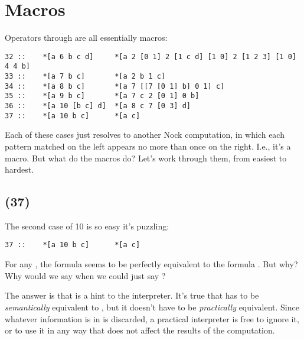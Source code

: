 \section{Macros}

Operators  through  are all essentially macros:

\begin{framed_shaded}
\begin{Verbatim}[fontsize=\relsize{-2.5},fontseries=b,commandchars=\\\{\}]
32 ::    *[a 6 b c d]     *[a 2 [0 1] 2 [1 c d] [1 0] 2 [1 2 3] [1 0] 4 4 b]
33 ::    *[a 7 b c]       *[a 2 b 1 c]
34 ::    *[a 8 b c]       *[a 7 [[7 [0 1] b] 0 1] c]
35 ::    *[a 9 b c]       *[a 7 c 2 [0 1] 0 b]
36 ::    *[a 10 [b c] d]  *[a 8 c 7 [0 3] d]
37 ::    *[a 10 b c]      *[a c]
\end{Verbatim}
\end{framed_shaded}
Each of these cases just resolves to another Nock computation, in
which each pattern matched on the left appears no more than once
on the right.  I.e., it's a macro.  But what do the macros do?
Let's work through them, from easiest to hardest.

\subsection{ (37)}

The second case of 10 is so easy it's puzzling:

\begin{framed_shaded}
\begin{Verbatim}[fontsize=\relsize{-2.5},fontseries=b,commandchars=\\\{\}]
37 ::    *[a 10 b c]      *[a c]
\end{Verbatim}
\end{framed_shaded}
For any , the formula \kode{[10 b c]} seems to be perfectly
equivalent to the formula .  But why?  Why would we say
\kode{[10 b c]} when we could just say ?

The answer is that  is a hint to the interpreter.  It's true
that \kode{[10 b c]} has to be \emph{semantically} equivalent to , but
it doesn't have to be \emph{practically} equivalent.  Since whatever
information is in  is discarded, a practical interpreter is
free to ignore it, or to use it in any way that does not affect
the results of the computation.

\subsection{}

